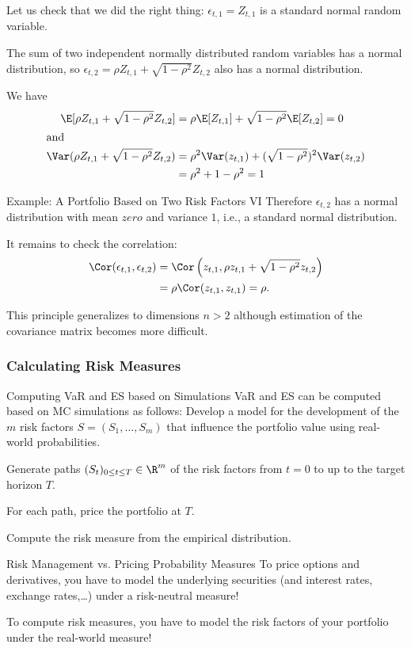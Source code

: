 	Let us check that we did the right thing:
		$\epsilon_{t,1}=Z_{t,1}$ is a standard normal random variable.
		
		The sum of two independent normally distributed random variables has a
		normal distribution, so $\epsilon_{t,2}=\rho Z_{t,1} +\sqrt{1-\rho^2}Z_{t,2}$
		also has a normal distribution.
		
		We have
			\abovedisplayskip=2pt
				\begin{align*}
					\E[\rho Z_{t,1} +\sqrt{1-\rho^2}Z_{t,2}] &= \rho\E[Z_{t,1}] +
					\sqrt{1-\rho^2}\E[Z_{t,2}] = 0\\
				\intertext{and}
				\Var(\rho Z_{t,1} +\sqrt{1-\rho^2}Z_{t,2}) &= \rho^2\Var(z_{t,1}) + (\sqrt{1-\rho^2})^2
			\Var(z_{t,2})\\
			 &= \rho^2 + 1 -\rho^2 =1
			\end{align*}


Example: A Portfolio Based on Two Risk Factors VI
		Therefore $\epsilon_{t,2}$ has a normal distribution with mean $zero$ and
		variance $1$, i.e., a standard normal distribution.
		
		It remains to check the correlation:
			\begin{align*}
				\Cor(\epsilon_{t,1},\epsilon_{t,2}) &= \Cor\left(z_{t,1},\rho z_{t,1} +
				\sqrt{1-\rho^2}z_{t,2}\right)\\ 
				 &= \rho \Cor(z_{t,1},z_{t,1}) =\rho.
			\end{align*}

	This principle generalizes to dimensions $n>2$ although estimation of the
	covariance matrix becomes more difficult.


\subsubsection{Calculating Risk Measures}

Computing VaR and ES based on Simulations
	VaR and ES can be computed based on MC simulations as follows:
		Develop a model for the development of the $m$ risk factors
		$S=(S_1,\ldots,S_m)$ that influence the portfolio value using real-world
		probabilities.
		
		Generate paths $(S_t)_{0\leq t\leq T}\in \R^m$ of the risk factors
		from $t=0$ to up to the target horizon $T$.
		
		For each path, price the portfolio at $T$.
		
		Compute the risk measure from the empirical distribution.


Risk Management vs. Pricing
	Probability Measures
		To price options and derivatives, you have to model the underlying securities
		(and interest rates, exchange rates,\ldots) under a risk-neutral measure!

		To compute risk measures, you have to model the risk factors of your portfolio
		under the real-world measure!